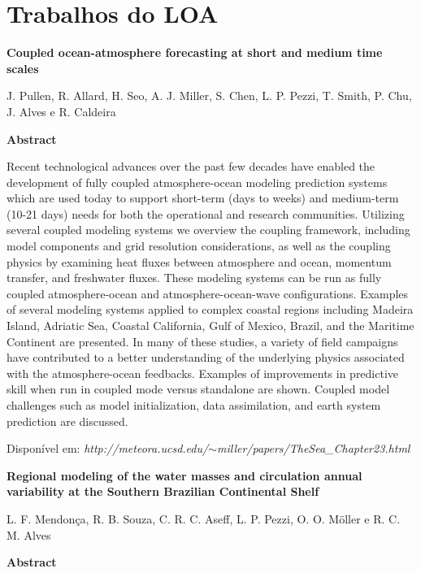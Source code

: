 \chapter{Trabalhos do LOA}
\bigskip

\noindent \begin{center}
\textbf{Coupled ocean-atmosphere forecasting at short and medium time scales}
\bigskip

\noindent J. Pullen, R. Allard, H. Seo, A. J. Miller, S. Chen, L. P. Pezzi, T. Smith, P. Chu, J. Alves e R. Caldeira
\bigskip

\noindent \textbf{Abstract}\end{center}
\bigskip

\noindent Recent technological advances over the past few decades have enabled the development of fully coupled atmosphere-ocean modeling prediction systems which are used today to support short-term (days to weeks) and medium-term (10-21 days) needs for both the operational and research communities. Utilizing several coupled modeling systems we overview the coupling framework, including model components and grid resolution considerations, as well as the coupling physics by examining heat fluxes between atmosphere and ocean, momentum transfer, and freshwater fluxes. These modeling systems can be run as fully coupled atmosphere-ocean and atmosphere-ocean-wave configurations. Examples of several modeling systems applied to complex coastal regions including Madeira Island, Adriatic Sea, Coastal California, Gulf of Mexico, Brazil, and the Maritime Continent are presented. In many of these studies, a variety of field campaigns have contributed to a better understanding of the underlying physics associated with the atmosphere-ocean feedbacks. Examples of improvements in predictive skill when run in coupled mode versus standalone are shown. Coupled model challenges such as model initialization, data assimilation, and earth system prediction are discussed.
\bigskip

\noindent \textcolor{black}{}
\bigskip

\noindent Disponível em: \textcolor{bleu_cite}{\textit{http://meteora.ucsd.edu/$\sim$miller/papers/TheSea\_Chapter23.html}}
\bigskip

\newpage
\bigskip

\noindent \begin{center} \textbf{Regional modeling of the water masses and circulation annual variability at the Southern Brazilian Continental Shelf}
\bigskip

\noindent L. F. Mendonça, R. B. Souza, C. R. C. Aseff, L. P. Pezzi, O. O. Möller e R. C. M. Alves
\bigskip

\noindent \textbf{Abstract}\end{center}
\bigskip

